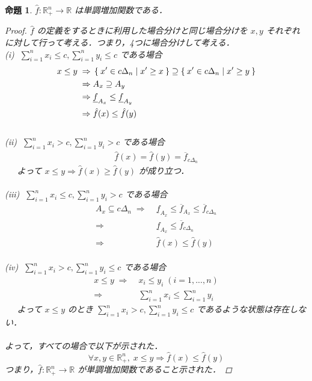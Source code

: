 \documentclass[a4paper,11pt]{jreport}
\newtheorem{proposition}{命題}
\begin{document}
\begin{proposition}
$ \hat{f} : \mathbb{R}_+^n \to \mathbb{R} $ は単調増加関数である．

\begin{proof}
$ \hat{f} $ の定義をするときに利用した場合分けと同じ場合分けを $ x, y $ それぞれに対して行って考える．つまり，4つに場合分けして考える．\\
(i) $ \; \sum_{i = 1}^{n} x_i \leq c, \sum_{i = 1}^{n} y_i \leq c $ である場合
\begin{align*}
x \leq y \; \Rightarrow & \; \Set{x' \in c \Delta_n | x' \geq x} \supseteq \Set{x' \in c \Delta_n | x' \geq y} \\
\Rightarrow & \; A_x \supseteq A_y \\
\Rightarrow & \; \underline{f}_{A_x} \leq \underline{f}_{A_y} \\
\Rightarrow & \; \hat{f}(x) \leq \hat{f}(y)
\end{align*}
\\
(ii) $ \; \sum_{i = 1}^{n} x_i > c, \sum_{i = 1}^{n} y_i > c $ である場合
\begin{align*}
\hat{f}(x) = \hat{f}(y) = \overline{f}_{c \Delta_n}
\end{align*}
$ \;\;\;\; $ よって $ x \leq y \Rightarrow \hat{f}(x) \geq \hat{f}(y) $ が成り立つ．\\
\\
(iii) $ \; \sum_{i = 1}^{n} x_i \leq c, \sum_{i = 1}^{n} y_i > c $ である場合
\begin{align*}
A_x \subseteq c \Delta_n \; \Rightarrow & \; \underline{f}_{A_x} \leq \overline{f}_{A_x} \leq \overline{f}_{c \Delta_n} \\
\Rightarrow & \; \underline{f}_{A_x} \leq \overline{f}_{c \Delta_n} \\
\Rightarrow & \; \hat{f}(x) \leq \hat{f}(y)
\end{align*}
\\
(iv) $ \; \sum_{i = 1}^{n} x_i > c, \sum_{i = 1}^{n} y_i \leq c $ である場合
\begin{align*}
x \leq y \; \Rightarrow & \; x_i \leq y_i \; (i = 1, ..., n) \\
\Rightarrow & \; \sum_{i = 1}^{n} x_i \leq \sum_{i = 1}^{n} y_i
\end{align*}
$ \;\;\;\; $ よって $ x \leq y $ のとき $ \sum_{i = 1}^{n} x_i > c, \sum_{i = 1}^{n} y_i \leq c $ であるような状態は存在しない．\\
\\
よって，すべての場合で以下が示された．
$$ \forall x, y \in \mathbb{R}_+^n, \; x \leq y \Rightarrow \hat{f}(x) \leq \hat{f}(y) $$
つまり，$ \hat{f} : \mathbb{R}_+^n \to \mathbb{R} $ が単調増加関数であること示された．
\end{proof}
\end{proposition}
\end{document}
